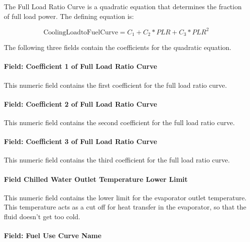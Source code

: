 The Full Load Ratio Curve is a quadratic equation that determines the fraction of full load power. The defining equation is:

\begin{equation}
{\mathrm{CoolingLoadtoFuelCurve}}
    = {C_1} + {C_2} * PLR + {C_3} * PL{R^2}
\end{equation}

The following three fields contain the coefficients for the quadratic equation.

\paragraph{Field: Coefficient 1 of Full Load Ratio Curve}\label{field-coefficient-1-of-full-load-ratio-curve-1}

This numeric field contains the first coefficient for the full load ratio curve.

\paragraph{Field: Coefficient 2 of Full Load Ratio Curve}\label{field-coefficient-2-of-full-load-ratio-curve-1}

This numeric field contains the second coefficient for the full load ratio curve.

\paragraph{Field: Coefficient 3 of Full Load Ratio Curve}\label{field-coefficient-3-of-full-load-ratio-curve-1}

This numeric field contains the third coefficient for the full load ratio curve.

\paragraph{Field Chilled Water Outlet Temperature Lower Limit}\label{field-chilled-water-outlet-temperature-lower-limit-3}

This numeric field contains the lower limit for the evaporator outlet temperature. This temperature acts as a cut off for heat transfer in the evaporator, so that the fluid doesn't get too cold.

\paragraph{Field: Fuel Use Curve Name}\label{field-fuel-use-curve-name}


